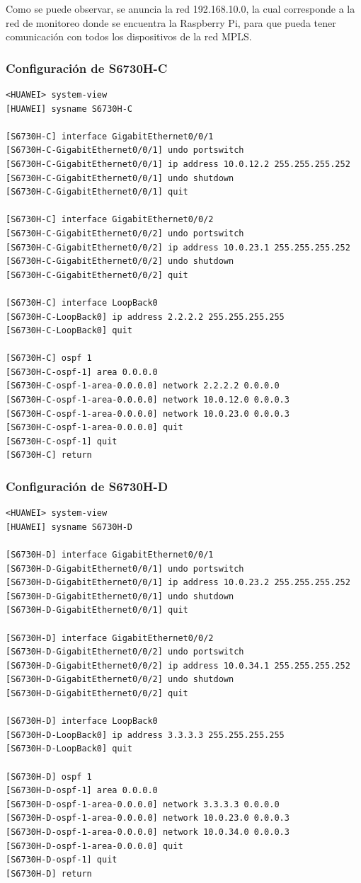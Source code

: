 Como se puede observar, se anuncia la red 192.168.10.0, la cual corresponde a la red de monitoreo donde se encuentra la Raspberry Pi, para que pueda tener comunicación con todos los dispositivos de la red MPLS.

\subsubsection{Configuración de S6730H-C}

\begin{lstlisting}[style=terminal]
<HUAWEI> system-view
[HUAWEI] sysname S6730H-C

[S6730H-C] interface GigabitEthernet0/0/1
[S6730H-C-GigabitEthernet0/0/1] undo portswitch
[S6730H-C-GigabitEthernet0/0/1] ip address 10.0.12.2 255.255.255.252
[S6730H-C-GigabitEthernet0/0/1] undo shutdown
[S6730H-C-GigabitEthernet0/0/1] quit

[S6730H-C] interface GigabitEthernet0/0/2
[S6730H-C-GigabitEthernet0/0/2] undo portswitch
[S6730H-C-GigabitEthernet0/0/2] ip address 10.0.23.1 255.255.255.252
[S6730H-C-GigabitEthernet0/0/2] undo shutdown
[S6730H-C-GigabitEthernet0/0/2] quit

[S6730H-C] interface LoopBack0
[S6730H-C-LoopBack0] ip address 2.2.2.2 255.255.255.255
[S6730H-C-LoopBack0] quit

[S6730H-C] ospf 1
[S6730H-C-ospf-1] area 0.0.0.0
[S6730H-C-ospf-1-area-0.0.0.0] network 2.2.2.2 0.0.0.0
[S6730H-C-ospf-1-area-0.0.0.0] network 10.0.12.0 0.0.0.3
[S6730H-C-ospf-1-area-0.0.0.0] network 10.0.23.0 0.0.0.3
[S6730H-C-ospf-1-area-0.0.0.0] quit
[S6730H-C-ospf-1] quit
[S6730H-C] return
\end{lstlisting}

\subsubsection{Configuración de S6730H-D}

\begin{lstlisting}[style=terminal]
<HUAWEI> system-view
[HUAWEI] sysname S6730H-D

[S6730H-D] interface GigabitEthernet0/0/1
[S6730H-D-GigabitEthernet0/0/1] undo portswitch
[S6730H-D-GigabitEthernet0/0/1] ip address 10.0.23.2 255.255.255.252
[S6730H-D-GigabitEthernet0/0/1] undo shutdown
[S6730H-D-GigabitEthernet0/0/1] quit

[S6730H-D] interface GigabitEthernet0/0/2
[S6730H-D-GigabitEthernet0/0/2] undo portswitch
[S6730H-D-GigabitEthernet0/0/2] ip address 10.0.34.1 255.255.255.252
[S6730H-D-GigabitEthernet0/0/2] undo shutdown
[S6730H-D-GigabitEthernet0/0/2] quit

[S6730H-D] interface LoopBack0
[S6730H-D-LoopBack0] ip address 3.3.3.3 255.255.255.255
[S6730H-D-LoopBack0] quit

[S6730H-D] ospf 1
[S6730H-D-ospf-1] area 0.0.0.0
[S6730H-D-ospf-1-area-0.0.0.0] network 3.3.3.3 0.0.0.0
[S6730H-D-ospf-1-area-0.0.0.0] network 10.0.23.0 0.0.0.3
[S6730H-D-ospf-1-area-0.0.0.0] network 10.0.34.0 0.0.0.3
[S6730H-D-ospf-1-area-0.0.0.0] quit
[S6730H-D-ospf-1] quit
[S6730H-D] return
\end{lstlisting}

